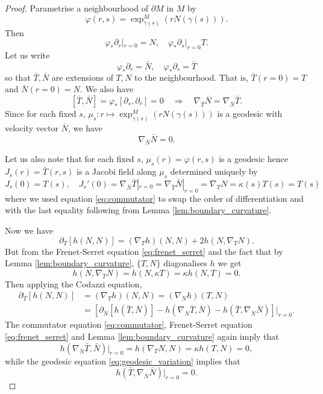 \documentclass[10pt]{amsart}
\theoremstyle{remark}
\begin{document}
\begin{proof}
Parametrise a neighbourhood of \(\partial M\) in \(M\) by
\[
\varphi(r, s) = \exp^M_{\gamma(s)} (r N(\gamma(s))).
\]
Then
\[
\varphi_{\ast} \partial_r |_{r=0} = N, \quad \varphi_{\ast} \partial_s |_{r=0} T.
\]
Let us write
\[
\varphi_{\ast} \partial_r = \bar{N}, \quad \varphi_{\ast} \partial_s = \bar{T}
\]
so that \(\bar{T}, \bar{N}\) are extensions of \(T, N\) to the neighbourhood. That is, \(\bar{T}(r=0) = T\) and \(\bar{N}(r=0) = N\). We also have
\begin{equation}
\label{eq:commutator}
[\bar{T}, \bar{N}] = \varphi_{\ast} [\partial_s, \partial_r] = 0 \quad \Rightarrow \quad \nabla_{\bar{T}} \bar{N} = \nabla_{\bar{N}} \bar{T}.
\end{equation}
Since for each fixed \(s\), \(\mu_s : r \mapsto \exp^M_{\gamma(s)} (rN(\gamma(s)))\) is a geodesic with velocity vector \(\bar{N}\), we have
\begin{equation}
\label{eq:geodesic_variation}
\nabla_{\bar{N}} \bar{N} = 0.
\end{equation}

Let us also note that for each fixed \(s\), \(\mu_s (r) = \varphi(r, s)\) is a geodesic hence \(J_s (r) = \bar{T}(r, s)\) is a Jacobi field along \(\mu_s\) determined uniquely by
\begin{equation}
\label{eq:jacobi}
J_s(0) = T(s), \quad J_s'(0) = \nabla_{\bar{N}} \bar{T}|_{r=0} = \nabla_{\bar{T}} \bar{N}|_{r=0} = \nabla_T N = \kappa(s) T (s) = T (s)
\end{equation}
where we used equation \eqref{eq:commutator} to swap the order of differentiation and with the last equality following from Lemma \ref{lem:boundary_curvature}.

Now we have
\[
\partial_T [h(N, N)] = (\nabla_T h) (N, N) + 2h(N, \nabla_{T} N).
\]
But from the Frenet-Serret equation \eqref{eq:frenet_serret} and the fact that by Lemma \ref{lem:boundary_curvature}, \(\{T, N\}\) diagonalises \(h\) we get
\[
h(N, \nabla_T N) = h(N, \kappa T) = \kappa h(N, T) = 0.
\]
Then applying the Codazzi equation,
\[
\begin{split}
\partial_T [h(N, N)] &= (\nabla_T h) (N, N) = (\nabla_N h) (T, N) \\
&= \left[\partial_{\bar{N}} [h(\bar{T}, \bar{N})] - h(\nabla_{\bar{N}} \bar{T}, \bar{N}) - h(\bar{T}, \nabla_{\bar{N}} \bar{N})\right]|_{r=0}.
\end{split}
\]
The commutator equation \eqref{eq:commutator}, Frenet-Serret equation \eqref{eq:frenet_serret} and Lemma \ref{lem:boundary_curvature} again imply that
\[
h(\nabla_{\bar{N}} \bar{T}, \bar{N})|_{r=0} = h(\nabla_T N, N) = \kappa h(T, N) = 0,
\]
while the geodesic equation \eqref{eq:geodesic_variation} implies that
\[
h(\bar{T}, \nabla_{\bar{N}} \bar{N})|_{r=0} = 0.
\]


\end{proof}
\end{document}
